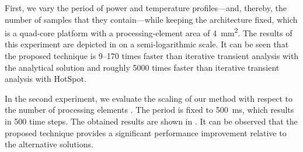 First, we vary the period \period of power and temperature profiles---and,
thereby, the number of samples \ns that they contain---while keeping the
architecture fixed, which is a quad-core platform with a processing-element area
of 4~mm\textsuperscript{2}. The results of this experiment are depicted in
 on a semi-logarithmic scale. It can be seen that the
proposed technique is 9--170 times faster than iterative transient analysis with
the analytical solution and roughly 5000 times faster than iterative transient
analysis with HotSpot.

In the second experiment, we evaluate the scaling of our method with respect to
the number of processing elements \np. The period is fixed to 500~ms, which
results in 500 time steps. The obtained results are shown in
. It can be observed that the proposed technique provides
a significant performance improvement relative to the alternative solutions.
